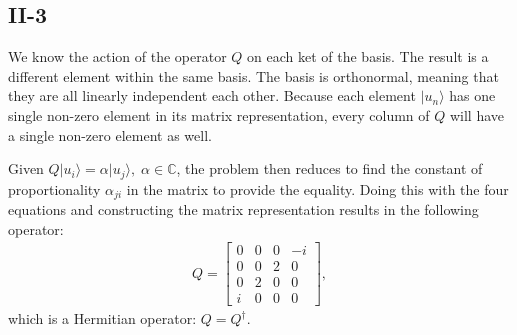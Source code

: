 \documentclass[letterpaper,11pt,twoside]{article}
\newcommand{\ket}[1]{|#1\rangle}
\begin{document}
\subsection*{II-3}
We know the action of the operator $Q$ on each ket of the basis. The result is a different element within the same basis. The basis is orthonormal, meaning that 
they are all linearly independent each other. Because each element $\ket{u_n}$ has one single non-zero element in its matrix representation,
every column of $Q$ will have a single non-zero element as well.

Given $Q\ket{u_i}=\alpha\ket{u_j},\;\alpha\in\mathbb{C}$, the problem then reduces to find the constant of proportionality $\alpha_{ji}$ in the matrix to provide the equality.
Doing this with the four equations and constructing the matrix representation results in the following operator:
\begin{align*}
  Q=\begin{bmatrix}
    0&0&0&-i\\
    0&0&2&0\\
    0&2&0&0\\
    i&0&0&0
  \end{bmatrix},
\end{align*}
which is a Hermitian operator: $Q=Q^\dagger$.


%
\end{document}
